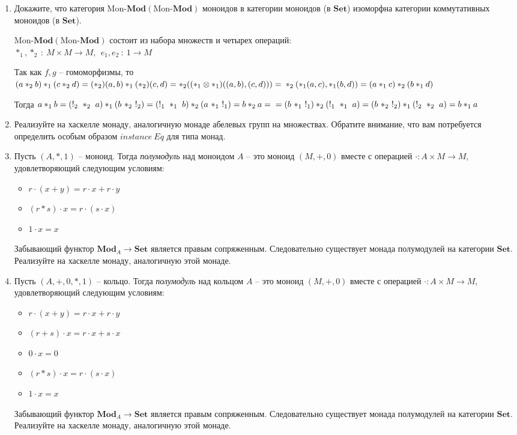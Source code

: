 \documentclass[draft]{article}
\newcommand{\cat}[1]{\mathbf{#1}}
\newcommand{\Set}{\cat{Set}}
\newcommand{\fs}[1]{\mathrm{#1}}
\newcommand{\Mod}[1]{#1\text{-}\cat{Mod}}
\begin{document}
\begin{enumerate}
\item Докажите, что категория $\Mod{\fs{Mon}}(\Mod{\fs{Mon}})$ моноидов в категории моноидов (в $\Set$) изоморфна категории коммутативных моноидов (в $\Set$).

$\Mod{\fs{Mon}}(\Mod{\fs{Mon}})$ состоит из набора множеств и четырех операций:\\
 $\ast_1, \ast_2 ~:~ M\times M \to M,~~e_1, e_2 ~:~ 1 \to M $
 
Так как $f, g$ -- гомоморфизмы, то \\
$(a \ast_2 b)\ast_1 (c \ast_2 d) = (\ast_2)(a, b)\ast_1 (\ast_2)(c, d) = \ast_2((\ast_1 \otimes \ast_1)((a, b), (c, d))) = \\
\ast_2(\ast_1(a, c), \ast_1(b, d)) = (a \ast_1 c)\ast_2 (b \ast_1 d)
$

Тогда 
$a \ast_1 b = (!_2 ~\ast_2~ a) \ast_1 (b ~\ast_2~ !_2) = (!_1 ~\ast_1~ b) \ast_2 (a ~\ast_1~ !_1) = b \ast_2 a = \\
=(b ~\ast_1~ !_1) \ast_2 (!_1 ~\ast_1~ a) =  
(b ~\ast_2~ !_2) \ast_1 (!_2 ~\ast_2~ a) = b \ast_1 a
 $

\item Реализуйте на хаскелле монаду, аналогичную монаде абелевых групп на множествах.
Обратите внимание, что вам потребуется определить особым образом $\mathit{instance}\ \mathit{Eq}$ для типа монад.

\item Пусть $(A,*,1)$ -- моноид.
Тогда \emph{полумодуль} над моноидом $A$ -- это моноид $(M,+,0)$ вместе с операцией $\cdot : A \times M \to M$, удовлетворяющий следующим условиям:
\begin{itemize}
\item $r \cdot (x + y) = r \cdot x + r \cdot y$
\item $(r * s) \cdot x = r \cdot (s \cdot x)$
\item $1 \cdot x = x$
\end{itemize}
Забывающий функтор $\cat{Mod}_A \to \Set$ является правым сопряженным.
Следовательно существует монада полумодулей на категории $\Set$.
Реализуйте на хаскелле монаду, аналогичную этой монаде.

\item Пусть $(A,+,0,*,1)$ -- кольцо.
Тогда \emph{полумодуль} над кольцом $A$ -- это моноид $(M,+,0)$ вместе с операцией $\cdot : A \times M \to M$, удовлетворяющий следующим условиям:
\begin{itemize}
\item $r \cdot (x + y) = r \cdot x + r \cdot y$
\item $(r + s) \cdot x = r \cdot x + s \cdot x$
\item $0 \cdot x = 0$
\item $(r * s) \cdot x = r \cdot (s \cdot x)$
\item $1 \cdot x = x$
\end{itemize}
Забывающий функтор $\cat{Mod}_A \to \Set$ является правым сопряженным.
Следовательно существует монада полумодулей на категории $\Set$.
Реализуйте на хаскелле монаду, аналогичную этой монаде.


\end{enumerate}
\end{document}
